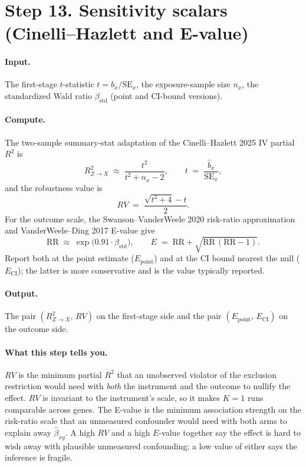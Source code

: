 \documentclass[11pt]{article}
\begin{document}
\section*{Step 13. Sensitivity scalars (Cinelli--Hazlett and E-value)}

\paragraph{Input.} The first-stage $t$-statistic $t=\hat b_x/\mathrm{SE}_x$, the exposure-sample size $n_x$, the standardized Wald ratio $\beta_{\mathrm{std}}$ (point and CI-bound versions).

\paragraph{Compute.} The two-sample summary-stat adaptation of the Cinelli--Hazlett 2025 IV partial $R^2$ is \citep{CinelliHazlett2025,CinelliHazlett2020}
\begin{equation}
R^2_{Z\to X} \;\approx\; \frac{t^2}{t^2 + n_x - 2},\qquad t \;=\; \frac{\hat b_x}{\mathrm{SE}_x},
\label{eq:partialR2}
\end{equation}
and the robustness value is
\begin{equation}
RV \;=\; \frac{\sqrt{t^2 + 4} - t}{2}.
\label{eq:RV}
\end{equation}
For the outcome scale, the Swanson--VanderWeele 2020 risk-ratio approximation \citep{SwansonVanderWeele2020} and VanderWeele--Ding 2017 E-value \citep{VanderWeeleDing2017} give
\begin{equation}
\mathrm{RR} \;\approx\; \exp\!\bigl(0.91 \cdot \beta_{\mathrm{std}}\bigr),\qquad E \;=\; \mathrm{RR} + \sqrt{\mathrm{RR}\,(\mathrm{RR}-1)}.
\label{eq:Evalue}
\end{equation}
Report both at the point estimate ($E_{\mathrm{point}}$) and at the CI bound nearest the null ($E_{\mathrm{CI}}$); the latter is more conservative and is the value typically reported.

\paragraph{Output.} The pair $(R^2_{Z\to X},\,RV)$ on the first-stage side and the pair $(E_{\mathrm{point}},\,E_{\mathrm{CI}})$ on the outcome side.

\paragraph{What this step tells you.} $RV$ is the minimum partial $R^2$ that an unobserved violator of the exclusion restriction would need with \emph{both} the instrument and the outcome to nullify the effect. $RV$ is invariant to the instrument's scale, so it makes $K=1$ runs comparable across genes. The E-value is the minimum association strength on the risk-ratio scale that an unmeasured confounder would need with both arms to explain away $\hat\beta_{xy}$. A high $RV$ and a high $E$-value together say the effect is hard to wish away with plausible unmeasured confounding; a low value of either says the inference is fragile.
\end{document}
